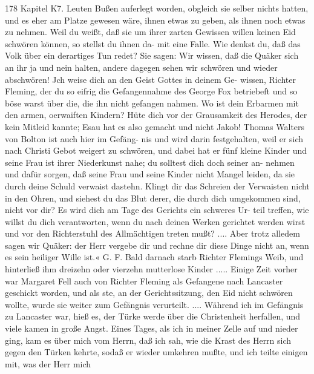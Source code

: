 178 Kapitel K7.
Leuten Bußen auferlegt worden, obgleich sie selber nichts hatten,
und es eher am Platze gewesen wäre, ihnen etwas zu geben, als
ihnen noch etwas zu nehmen. Weil du weißt, daß sie um ihrer zarten
Gewissen willen keinen Eid schwören können, so stellst du ihnen da-
mit eine Falle. Wie denkst du, daß das Volk über ein derartiges
Tun redet? Sie sagen: Wir wissen, daß die Quäker sich an ihr
ja und nein halten, andere dagegen sehen wir schwören und wieder
abschwören! Jch weise dich an den Geist Gottes in deinem Ge-
wissen, Richter Fleming, der du so eifrig die Gefangennahme
des George Fox betriebeft und so böse warst über die, die ihn
nicht gefangen nahmen. Wo ist dein Erbarmen mit den armen,
oerwaiften Kindern? Hüte dich vor der Grausamkeit des Herodes,
der kein Mitleid kannte; Esau hat es also gemacht und nicht
Jakob! Thomas Walters von Bolton ist auch hier im Gefäng-
nis und wird darin festgehalten, weil er sich nach Christi Gebot
weigert zu schwören, und dabei hat er fünf kleine Kinder und seine
Frau ist ihrer Niederkunst nahe; du solltest dich doch seiner an-
nehmen und dafür sorgen, daß seine Frau und seine Kinder nicht
Mangel leiden, da sie durch deine Schuld verwaist dastehn.
Klingt dir das Schreien der Verwaisten nicht in den Ohren, und
siehest du das Blut derer, die durch dich umgekommen sind, nicht
vor dir? Es wird dich am Tage des Gerichts ein schweres Ur-
teil treffen, wie willst du dich verantworten, wenn du nach deinen
Werken gerichtet werden wirst und vor den Richterstuhl des
Allmächtigen treten mußt? .... Aber trotz alledem sagen wir
Quäker: der Herr vergebe dir und rechne dir diese Dinge nicht
an, wenn es sein heiliger Wille ist.« G. F.
Bald darnach starb Richter Flemings Weib, und hinterließ
ihm dreizehn oder vierzehn mutterlose Kinder .....
Einige Zeit vorher war Margaret Fell auch von Richter
Fleming als Gefangene nach Lancaster geschickt worden, und als
ste, an der Gerichtssitzung, den Eid nicht schwören wollte, wurde
sie weiter zum Gefängnis verurteilt. ....
Während ich im Gefängnis zu Lancaster war, hieß es, der
Türke werde über die Christenheit herfallen, und viele kamen in
große Angst. Eines Tages, als ich in meiner Zelle auf und
nieder ging, kam es über mich vom Herrn, daß ich sah, wie die
Krast des Herrn sich gegen den Türken kehrte, sodaß er wieder
umkehren mußte, und ich teilte einigen mit, was der Herr mich


